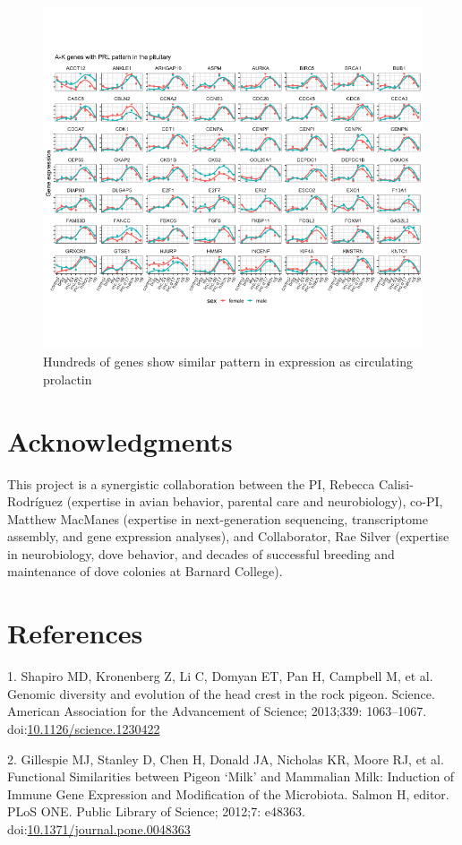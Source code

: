 \documentclass[10pt,letterpaper]{article}
\begin{document}
\begin{figure}
\centering
\includegraphics{characterization_manuscript_files/figure-latex/unnamed-chunk-6-1.pdf}
\caption{Hundreds of genes show similar pattern in expression as
circulating prolactin}
\end{figure}

\hypertarget{acknowledgments}{%
\section{Acknowledgments}\label{acknowledgments}}

This project is a synergistic collaboration between the PI, Rebecca
Calisi-Rodríguez (expertise in avian behavior, parental care and
neurobiology), co-PI, Matthew MacManes (expertise in next-generation
sequencing, transcriptome assembly, and gene expression analyses), and
Collaborator, Rae Silver (expertise in neurobiology, dove behavior, and
decades of successful breeding and maintenance of dove colonies at
Barnard College).

\hypertarget{references}{%
\section*{References}\label{references}}

\hypertarget{refs}{}
\leavevmode\hypertarget{ref-Shapiro1063}{}%
1. Shapiro MD, Kronenberg Z, Li C, Domyan ET, Pan H, Campbell M, et al.
Genomic diversity and evolution of the head crest in the rock pigeon.
Science. American Association for the Advancement of Science; 2013;339:
1063--1067.
doi:\href{https://doi.org/10.1126/science.1230422}{10.1126/science.1230422}

\leavevmode\hypertarget{ref-Gillespie2012}{}%
2. Gillespie MJ, Stanley D, Chen H, Donald JA, Nicholas KR, Moore RJ, et
al. Functional Similarities between Pigeon `Milk' and Mammalian Milk:
Induction of Immune Gene Expression and Modification of the Microbiota.
Salmon H, editor. PLoS ONE. Public Library of Science; 2012;7: e48363.
doi:\href{https://doi.org/10.1371/journal.pone.0048363}{10.1371/journal.pone.0048363}

\nolinenumbers
\end{document}

